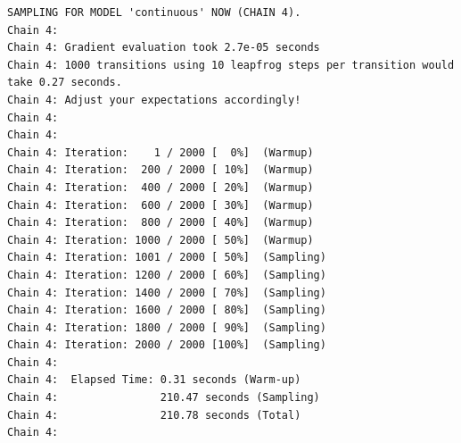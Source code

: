 \documentclass[
  letterpaper,
  DIV=11,
  numbers=noendperiod]{scrartcl}
\begin{document}
\begin{verbatim}
SAMPLING FOR MODEL 'continuous' NOW (CHAIN 4).
Chain 4: 
Chain 4: Gradient evaluation took 2.7e-05 seconds
Chain 4: 1000 transitions using 10 leapfrog steps per transition would take 0.27 seconds.
Chain 4: Adjust your expectations accordingly!
Chain 4: 
Chain 4: 
Chain 4: Iteration:    1 / 2000 [  0%]  (Warmup)
Chain 4: Iteration:  200 / 2000 [ 10%]  (Warmup)
Chain 4: Iteration:  400 / 2000 [ 20%]  (Warmup)
Chain 4: Iteration:  600 / 2000 [ 30%]  (Warmup)
Chain 4: Iteration:  800 / 2000 [ 40%]  (Warmup)
Chain 4: Iteration: 1000 / 2000 [ 50%]  (Warmup)
Chain 4: Iteration: 1001 / 2000 [ 50%]  (Sampling)
Chain 4: Iteration: 1200 / 2000 [ 60%]  (Sampling)
Chain 4: Iteration: 1400 / 2000 [ 70%]  (Sampling)
Chain 4: Iteration: 1600 / 2000 [ 80%]  (Sampling)
Chain 4: Iteration: 1800 / 2000 [ 90%]  (Sampling)
Chain 4: Iteration: 2000 / 2000 [100%]  (Sampling)
Chain 4: 
Chain 4:  Elapsed Time: 0.31 seconds (Warm-up)
Chain 4:                210.47 seconds (Sampling)
Chain 4:                210.78 seconds (Total)
Chain 4: 
\end{verbatim}
\end{document}
